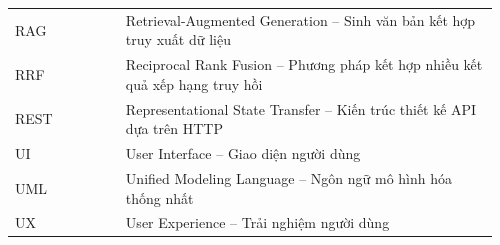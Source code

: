 \begin{longtable}{@{}p{0.22\linewidth}p{0.74\linewidth}@{}}
RAG  & Retrieval-Augmented Generation -- Sinh văn bản kết hợp truy xuất dữ liệu \\

RRF  & Reciprocal Rank Fusion -- Phương pháp kết hợp nhiều kết quả xếp hạng truy hồi \\

REST & Representational State Transfer -- Kiến trúc thiết kế API dựa trên HTTP \\

UI   & User Interface -- Giao diện người dùng \\

UML  & Unified Modeling Language -- Ngôn ngữ mô hình hóa thống nhất \\

UX   & User Experience -- Trải nghiệm người dùng \\
\bottomrule
\end{longtable}
